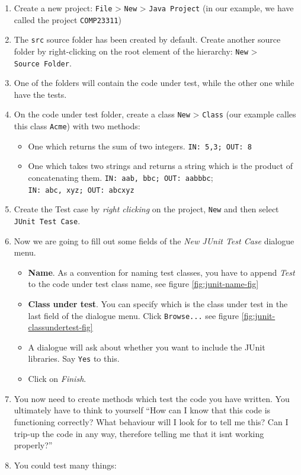 \documentclass[
]{book}
\providecommand{\tightlist}{%
  \setlength{\itemsep}{0pt}\setlength{\parskip}{0pt}}
\begin{document}
\begin{enumerate}
\def\labelenumi{\arabic{enumi}.}
\tightlist
\item
  Create a new project: \texttt{File} \textgreater{} \texttt{New} \textgreater{} \texttt{Java\ Project} (in our example, we have called the project \texttt{COMP23311})
\item
  The \texttt{src} source folder has been created by default. Create another source folder by right-clicking on the root element of the hierarchy: \texttt{New} \textgreater{} \texttt{Source\ Folder}.
\item
  One of the folders will contain the code under test, while the other one while have the tests.
\item
  On the code under test folder, create a class \texttt{New} \textgreater{} \texttt{Class} (our example calles this class \texttt{Acme}) with two methods:

  \begin{itemize}
  \tightlist
  \item
    One which returns the sum of two integers. \texttt{IN:\ 5,3;\ OUT:\ 8}
  \item
    One which takes two strings and returns a string which is the product of concatenating them. \texttt{IN:\ aab,\ bbc;\ OUT:\ aabbbc}; \texttt{IN:\ abc,\ xyz;\ OUT:\ abcxyz}
  \end{itemize}
\item
  Create the Test case by \emph{right clicking} on the project, \texttt{New} and then select \texttt{JUnit\ Test\ Case}.
\item
  Now we are going to fill out some fields of the \emph{New JUnit Test Case} dialogue menu.

  \begin{itemize}
  \tightlist
  \item
    \textbf{Name}. As a convention for naming test classes, you have to append \emph{Test} to the code under test class name, see figure \ref{fig:junit-name-fig}
  \item
    \textbf{Class under test}. You can specify which is the class under test in the last field of the dialogue menu. Click \texttt{Browse...} see figure \ref{fig:junit-classundertest-fig}
  \item
    A dialogue will ask about whether you want to include the JUnit libraries. Say \texttt{Yes} to this.
  \item
    Click on \emph{Finish}.
  \end{itemize}
\item
  You now need to create methods which test the code you have written. You ultimately have to think to yourself ``How can I know that this code is functioning correctly? What behaviour will I look for to tell me this? Can I trip-up the code in any way, therefore telling me that it isnt working properly?''
\item
  You could test many things:


\end{enumerate}
\end{document}
